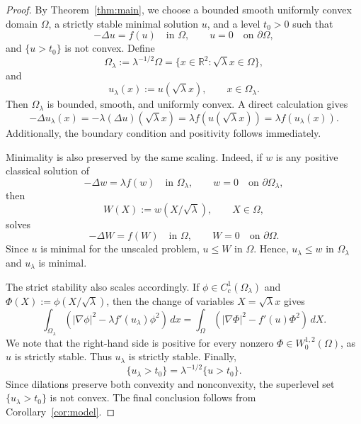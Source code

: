 \documentclass[reqno,12pt]{amsart}
\numberwithin{equation}{section}
\theoremstyle{remark}
\begin{document}
\begin{proof}
By Theorem~\ref{thm:main}, we choose a bounded smooth uniformly convex domain
$\Omega$, a strictly stable minimal solution $u$, and a level $t_0>0$ such
that
$$
-\Delta u=f(u)\quad\text{in }\Omega,
\qquad u=0\quad\text{on }\partial\Omega,
$$
and $\{u>t_0\}$ is not convex.  Define
$$
\Omega_\lambda:=\lambda^{-1/2}\Omega =\{x\in\mathbb R^2:\sqrt\lambda x\in\Omega\},
$$
and
$$
u_\lambda(x):=u(\sqrt\lambda x), \qquad x\in\Omega_\lambda.
$$
Then $\Omega_\lambda$ is bounded, smooth, and uniformly convex.  A direct
calculation gives
$$
-\Delta u_\lambda(x) =-\lambda (\Delta u)(\sqrt\lambda x)
=\lambda f(u(\sqrt\lambda x)) =\lambda f(u_\lambda(x)).
$$
Additionally, the boundary condition and positivity follows immediately.

Minimality is also preserved by the same scaling.  Indeed, if $w$ is any positive classical solution of
$$
-\Delta w=\lambda f(w)
\quad\text{in }\Omega_\lambda,
\qquad w=0\quad\text{on }\partial\Omega_\lambda,
$$
then
$$
W(X):=w(X/\sqrt\lambda), \qquad X\in\Omega,
$$
solves
$$
-\Delta W=f(W) \quad\text{in }\Omega,
\qquad W=0\quad\text{on }\partial\Omega.
$$
Since $u$ is minimal for the unscaled problem, $u\le W$ in $\Omega$.  Hence, $u_\lambda\le w$ in $\Omega_\lambda$  and $u_\lambda$ is minimal.

The strict stability also scales accordingly.  If $\phi\in C_c^1(\Omega_\lambda)$ and
$\Phi(X):=\phi(X/\sqrt\lambda)$, then the change of variables
$X=\sqrt\lambda x$ gives
$$
\int_{\Omega_\lambda}
\left(|\nabla\phi|^2-\lambda f'(u_\lambda)\phi^2\right)\,dx
= \int_\Omega \left(|\nabla\Phi|^2-f'(u)\Phi^2\right)\,dX.
$$
We note that the right-hand side is positive for every nonzero $\Phi\in W_0^{1,2}(\Omega)$, as $u$ is strictly stable.  Thus $u_\lambda$ is strictly stable. Finally,
$$
\{u_\lambda>t_0\}=\lambda^{-1/2}\{u>t_0\}.
$$
Since dilations preserve both convexity and nonconvexity, the superlevel set
$\{u_\lambda>t_0\}$ is not convex.  The final conclusion follows from Corollary~\ref{cor:model}.
\end{proof}
 
\end{document}
